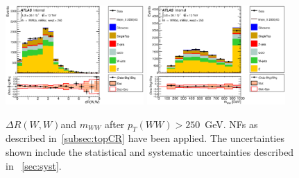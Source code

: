 \begin{figure}[!h]
\begin{center}
\includegraphics*[width=0.47\textwidth] {figures/ControlPlots/reOpt2000/C_mBBcr_reOpt2000_bbpt350_wwpt250_drww_regionA_met25d020}
\includegraphics*[width=0.47\textwidth] {figures/ControlPlots/reOpt2000/C_mBBcr_reOpt2000_bbpt350_wwpt250_WWMass_regionA_met25d020.eps}
\caption[$\Delta R(W,W)$and  $m_{WW}$ after $p_{T}(WW) > 250$~GeV.]{$\Delta R(W,W)$and  $m_{WW}$ after $p_{T}(WW) > 250$~GeV.  \ttbar NFs as described in~\ref{subsec:topCR} have been applied. The uncertainties shown include the statistical and systematic uncertainties described in ~\ref{sec:syst}.}
\end{center}
\end{figure}

